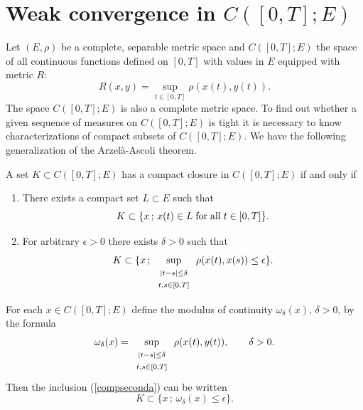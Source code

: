 \documentclass[preprint]{imsart}
\begin{document}
{\section{Weak convergence in $C([0,T];E)$}



Let $(E,\rho)$ be a complete, separable metric space
and  $C([0,T];E)$ the space of all continuous functions
defined on $[0,T]$ with values in $E$ equipped with
metric $R$:
\begin{equation}\label{defdiR}
R(x,y)=\sup_{t\in [0,T]} \rho (x(t),y(t)).
\end{equation}
The space  $C([0,T];E)$ is also a complete metric
space. To find out whether a given sequence of measures
on  $C([0,T];E)$ is tight it is necessary to know
characterizations of compact subsets of  $C([0,T];E)$.
We have the following generalization of the
Arzel\`a-Ascoli theorem.



\begin{Proposition}
A set $K\subset  C([0,T];E)$ has a compact closure in
$C([0,T];E)$ if and only if
\begin{enumerate}
  \item[(i)] There exists a compact set $L\subset E$ such that
\begin{equation}\label{compprima}
K\subset \{ x\, ;\, x(t)\in L {\rm \; for \; all\; }
t\in [0,T]\}.
\end{equation}


  \item[(ii)] For arbitrary $\epsilon >0$ there
  exists $\delta >0$ such that
\begin{equation}\label{compseconda}
K\subset \{ x\, ;\,
\sup_{
\begin{array}{c}
\begin{scriptstyle}
|t-s|\leq \delta
\end{scriptstyle}
 \\ \begin{scriptstyle}
 t,s\in [0,T]
 \end{scriptstyle}
\end{array}
 }
\rho(x(t),x(s))\leq \epsilon
\}.
\end{equation}
\end{enumerate}
\end{Proposition}


For each $x\in C([0,T];E)$ define the modulus of
continuity $\omega_\delta (x)$, $\delta >0$, by the
formula
\begin{equation}\label{modcontin}
\omega_\delta (x)=
\sup_{
\begin{array}{c}
\begin{scriptstyle}
|t-s|\leq \delta
\end{scriptstyle}
 \\ \begin{scriptstyle}
 t,s\in [0,T]
 \end{scriptstyle}
\end{array}
 }
\rho(x(t),y(t)),\qquad \delta >0.
\end{equation}
Then the inclusion (\ref{compseconda}) can be written
$$
K\subset \{ x\, ;\,
\omega_\delta (x)
\leq \epsilon
\}.
$$

}
\end{document}
